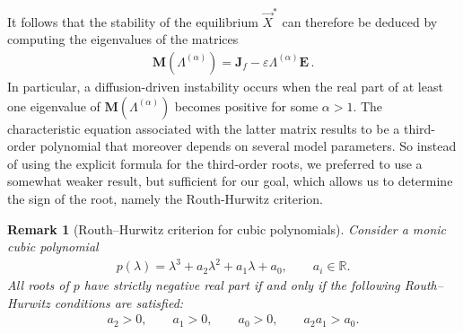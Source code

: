 \documentclass[aps,showpacs,preprintnumbers,amsmath,amssymb,twocolumn,superscriptaddress,floatfix,nofootinbib,10pt,pre]{revtex4-1}
\newtheorem{remark}[theorem]{Remark}
\begin{document}

It follows that the stability of the equilibrium $\vec{X}^*$ can therefore be deduced by computing the eigenvalues of the matrices
\begin{align}
\label{eq:MlambdaLor}
\mathbf M(\Lambda^{(\alpha)}) =
\mathbf J_f - \varepsilon \Lambda^{(\alpha)} \mathbf{E}\, .
\end{align}
In particular, a diffusion-driven instability occurs when the real part of at least one eigenvalue of $\mathbf M(\Lambda^{(\alpha)})$ becomes positive for some $\alpha>1$. The characteristic equation associated with the latter matrix results to be a third-order polynomial that moreover depends on several model parameters. So instead of using the explicit formula for the third-order roots, we preferred to use a somewhat weaker result, but sufficient for our goal, which allows us to determine the sign of the root, namely the Routh-Hurwitz criterion.
\begin{remark}[Routh--Hurwitz criterion for cubic polynomials]\label{rem:criterion}
Consider a monic cubic polynomial
\begin{align}
p(\lambda)=\lambda^3+a_2\lambda^2+a_1\lambda+a_0,
\qquad a_i\in\mathbb{R}.
\end{align}
All roots of $p$ have strictly negative real part if and only if the following
Routh--Hurwitz conditions are satisfied:
\begin{align}
\label{eq:RHcubic}
a_2>0,\qquad a_1>0,\qquad a_0>0,\qquad a_2a_1>a_0.
\end{align}
\end{remark}
\end{document}
